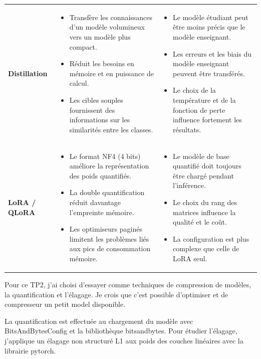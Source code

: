 \documentclass[12pt,a4paper]{report}
\begin{document}
\begin{table}[!htbp]
\begin{tabularx}{\textwidth}{
    >{\RaggedRight\arraybackslash}p{2.8cm}
    >{\RaggedRight\arraybackslash}X
    >{\RaggedRight\arraybackslash}X
}
\textbf{Distillation} &
\begin{itemize}
    \item Transfère les connaissances d'un modèle volumineux vers un modèle plus compact.
    \item Réduit les besoins en mémoire et en puissance de calcul.
    \item Les cibles souples fournissent des informations sur les similarités entre les classes.
\end{itemize}
&
\begin{itemize}
    \item Le modèle étudiant peut être moins précis que le modèle enseignant.
    \item Les erreurs et les biais du modèle enseignant peuvent être transférés.
    \item Le choix de la température et de la fonction de perte influence fortement les résultats.
\end{itemize}
\\

\textbf{LoRA / QLoRA} &
\begin{itemize}
    \item Le format NF4 (4 bits) améliore la représentation des poids quantifiés.
    \item La double quantification réduit davantage l'empreinte mémoire.
    \item Les optimiseurs paginés limitent les problèmes liés aux pics de consommation mémoire.
\end{itemize}
&
\begin{itemize}
    \item Le modèle de base quantifié doit toujours être chargé pendant l'inférence.
    \item Le choix du rang des matrices influence la qualité et le coût.
    \item La configuration est plus complexe que celle de LoRA seul.
\end{itemize}
\\

\bottomrule
\end{tabularx}
\end{table}


Pour ce TP2, j'ai choisi d'essayer comme techniques de compression de modèles, la quantification et l'élagage. Je crois que c'est possible d'optimiser et de compresseur un petit model disponible.

La quantification est effectuée au chargement du modèle avec BitsAndBytesConfig et la bibliothèque bitsandbytes. 
Pour étudier l'élagage, j'applique un élagage non structuré L1 aux poids des couches linéaires avec la librairie pytorch.
\end{document}

